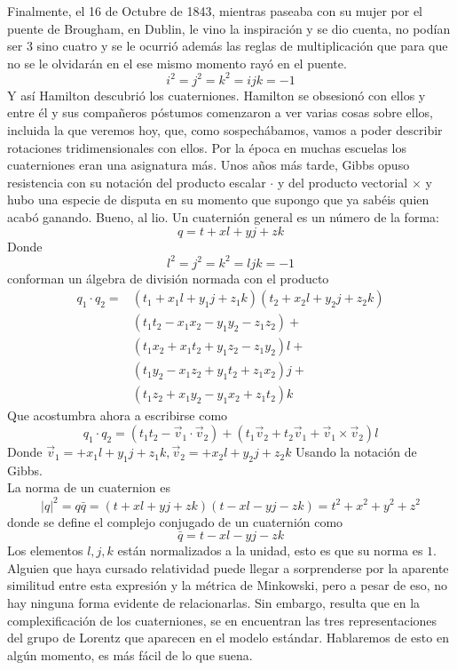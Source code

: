 \documentclass[12pt]{article}
\begin{document}
Finalmente, el 16 de Octubre de 1843, mientras paseaba con su mujer por el puente de Brougham, en Dublin, le vino la inspiración y se dio cuenta, no podían ser $3$ sino cuatro y se le ocurrió además las reglas de multiplicación que para que no se le olvidarán en el ese mismo momento rayó en el puente. 
$$i^2=j^2=k^2=ijk=-1$$
Y así Hamilton descubrió los cuaterniones. Hamilton se obsesionó con ellos y entre él y sus compañeros póstumos comenzaron a ver varias cosas sobre ellos, incluida la que veremos hoy, que, como sospechábamos, vamos a poder describir rotaciones tridimensionales con ellos. Por la época en muchas escuelas los cuaterniones eran una asignatura más. Unos años más tarde, Gibbs opuso resistencia con su notación del producto escalar $\cdot$ y del producto vectorial $\times$ y hubo una especie de disputa en su momento que supongo que ya sabéis quien acabó ganando. Bueno, al lio. Un cuaternión general es un número de la forma:
\begin{equation}
    q=t+xl+yj+zk
\end{equation}
Donde 
$$l^2=j^2=k^2=ljk=-1$$ conforman un álgebra de división normada con el producto
\begin{equation}
    \begin{split}
        q_1 \cdot q_2  =& (t_1+x_1 l + y_1 j +z_1 k) (t_2+x_2l+y_2 j +z_2 k) \\
        & (t_1t_2 - x_1x_2 - y_1y_2 - z_1z_2) +  \\
        &(t_1x_2 + x_1t_2 + y_1z_2 - z_1y_2)l + \\
        &(t_1y_2 - x_1z_2 + y_1t_2 + z_1x_2)j +\\
        &(t_1z_2 + x_1y_2 - y_1x_2 + z_1t_2)k
    \end{split}
\end{equation}
Que acostumbra ahora a escribirse como
\begin{equation}
    q_1 \cdot q_2 = (t_1t_2 - \vec{v}_1 \cdot \vec{v}_2) + (t_1 \vec{v}_2 + t_2\vec{v}_1 + \vec{v}_1 \times \vec{v}_2)l
\end{equation}
Donde $\vec v_1 =+x_1 l + y_1 j +z_1 k,  \vec v_2=+x_2 l + y_2 j +z_2 k$ Usando la notación de Gibbs.\\
La norma de un cuaternion es
$$|q|^2=q\bar q=(t+xl+yj+zk)(t-xl-yj-zk)=t^2+x^2+y^2+z^2$$
donde se define el complejo conjugado de un cuaternión como
$$ \bar q =t-xl-yj-zk$$
Los  elementos $l,j,k$ están normalizados a la unidad, esto es que su norma es $1$. Alguien que haya cursado relatividad puede llegar a sorprenderse por la aparente similitud entre esta expresión y la métrica de Minkowski, pero a pesar de eso, no hay ninguna forma evidente de relacionarlas. Sin embargo, resulta que en la complexificación de los cuaterniones, se en encuentran las tres representaciones del grupo de Lorentz que aparecen en el modelo estándar. Hablaremos de esto en algún momento, es más fácil de lo que suena. \\\\\
\end{document}
